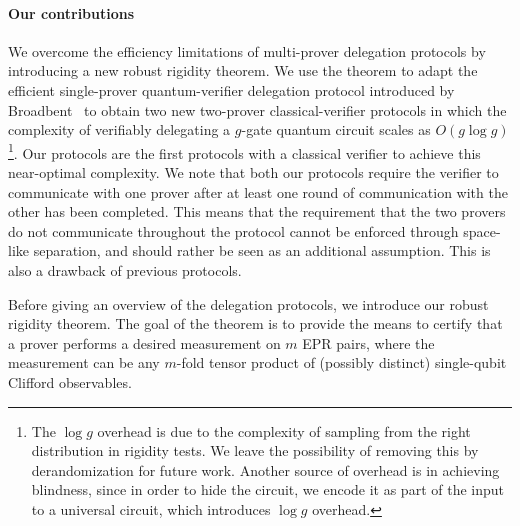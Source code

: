 \documentclass[11pt,letter]{article}
\theoremstyle{remark}
\theoremstyle{definition}
\begin{document}
\paragraph{Our contributions} We overcome the efficiency limitations of
multi-prover delegation protocols by introducing a new robust rigidity theorem.
We use the theorem to adapt the efficient single-prover quantum-verifier delegation
protocol introduced by Broadbent~\cite{broadbent15howtoverify} to obtain two new
two-prover classical-verifier protocols in which the complexity of verifiably
delegating a $g$-gate quantum circuit scales as $O(g\log g)$\footnote{The $\log g$ overhead is due to the complexity of sampling from the right distribution in rigidity tests. We leave the possibility of removing this by derandomization for future work. Another source of overhead is in achieving blindness, since in order to hide the circuit, we encode it as part of the input to a universal circuit, which introduces $\log g$ overhead.}.  %
Our protocols are the first protocols with a classical verifier to achieve this near-optimal complexity. We note that both our protocols require the verifier to communicate with one prover after at least one round of communication with the other has been completed. This means that the requirement that the two provers do not communicate throughout the protocol cannot be enforced through space-like separation, and should rather be seen as an additional assumption. This is also a drawback of previous protocols.

Before giving an overview of the delegation protocols, we introduce our robust rigidity theorem. The goal of the theorem is to provide the means to certify that a prover performs a desired measurement on $m$ EPR pairs, where the measurement can be any $m$-fold tensor product of (possibly distinct) single-qubit Clifford observables.
\end{document}
